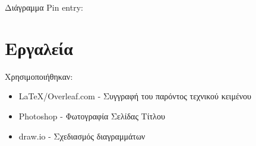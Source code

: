 \documentclass{article}
\begin{document}
\newpage
\noindent Διάγραμμα Pin entry: \\
\noindent{}
\newpage

\section{Εργαλεία}
Χρησιμοποιήθηκαν:
\begin{itemize}
    \item \LaTeX/Overleaf.com - Συγγραφή του παρόντος τεχνικού κειμένου
    \item Photoshop - Φωτογραφία Σελίδας Τίτλου
    \item draw.io - Σχεδιασμός διαγραμμάτων
\end{itemize}
\end{document}

